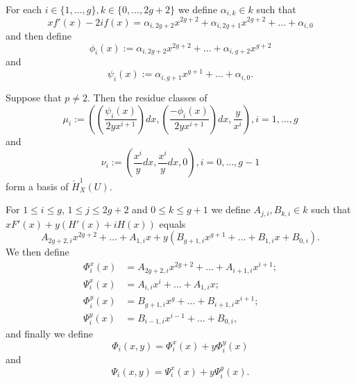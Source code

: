 \documentclass{beamer}
\begin{document}


\begin{frame}
For each $i \in \{1, \ldots, g\}, k \in \{0, \ldots , 2g+2\}$ we define $\alpha_{i,k}\in k$ such that
\[
xf'(x) - 2if(x) = \alpha_{i,2g+2}x^{2g+2} + \alpha_{i, 2g+1}x^{2g+2} + \ldots + \alpha_{i,0}
\]
and then define
\[
\phi_i(x)  := \alpha_{i,2g+2}x^{2g+2} + \ldots + \alpha_{i,g+2}x^{g+2} 
\]
and
\[
\psi_i(x) := \alpha_{i,g+1}x^{g+1} + \ldots + \alpha_{i,0}.
\]
\pause
\begin{theorem}
Suppose that $p \neq 2$. Then the residue classes of
\[
\mu_i := \left( \left( \frac{\psi_i(x)}{2yx^{i+1}} \right) dx, \left(\frac{-\phi_i(x)}{2yx^{i+1}} \right)dx, \frac{y}{x^i} \right), i= 1, \ldots, g
\]
and
\[
\nu_i := \left( \frac{x^i}{y}dx, \frac{x^i}{y}dx, 0 \right), i = 0, \ldots, g-1
\]
form a basis of $\check{H}^1_X(U)$.
\end{theorem}
\end{frame}




\begin{frame}
For $1 \leq i \leq g$, $1 \leq j \leq 2g+2$ and $0 \leq k \leq g+1$ we define $A_{j,i}, B_{k,i} \in k$ such that $xF'(x) + y(H'(x) + iH(x))$ equals
\[
A_{2g+2,i}x^{2g+2} + \dots + A_{1,i}x + y (B_{g+1,i}x^{g+1} + \dots + B_{1,i}x + B_{0,i}).
\]
\pause
We then define
\begin{align*}
\Phi_i^x(x) & = A_{2g+2,i}x^{2g+2} + \dots + A_{i+1,i}x^{i+1};\\
\Psi_i^x(x) & = A_{i,i}x^i + \dots + A_{1,i}x;\\
\Phi_i^y(x) & = B_{g+1,i}x^g + \dots + B_{i+1,i}x^{i+1};\\
\Psi_i^y(x) & = B_{i-1,i}x^{i-1} + \dots + B_{0,i},
\end{align*}
and finally we define 
\[
\Phi_i(x,y) = \Phi_i^x(x) + y\Phi_i^y(x)
\]
and 
\[
\Psi_i(x,y) = \Psi_i^x(x) + y\Psi_i^y(x).
\]

\end{frame}
\end{document}
